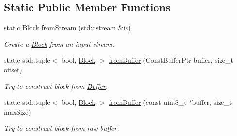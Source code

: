 \subsection*{Static Public Member Functions}
\begin{DoxyCompactItemize}
\item 
static \hyperlink{classndn_1_1Block}{Block} \hyperlink{classndn_1_1Block_ab8597954477e226870ebfe852b71eaef}{from\+Stream} (std\+::istream \&is)\hypertarget{classndn_1_1Block_ab8597954477e226870ebfe852b71eaef}{}\label{classndn_1_1Block_ab8597954477e226870ebfe852b71eaef}

\begin{DoxyCompactList}\small\item\em Create a \hyperlink{classndn_1_1Block}{Block} from an input stream. \end{DoxyCompactList}\item 
static std\+::tuple$<$ bool, \hyperlink{classndn_1_1Block}{Block} $>$ \hyperlink{classndn_1_1Block_af540ada44f352d3cbc246a8f878488e1}{from\+Buffer} (Const\+Buffer\+Ptr buffer, size\+\_\+t offset)
\begin{DoxyCompactList}\small\item\em Try to construct block from \hyperlink{classndn_1_1Buffer}{Buffer}. \end{DoxyCompactList}\item 
static std\+::tuple$<$ bool, \hyperlink{classndn_1_1Block}{Block} $>$ \hyperlink{classndn_1_1Block_a1bf94a97bafd1c0e3f7b21bc71416b1b}{from\+Buffer} (const uint8\+\_\+t $\ast$buffer, size\+\_\+t max\+Size)
\begin{DoxyCompactList}\small\item\em Try to construct block from raw buffer. \end{DoxyCompactList}\end{DoxyCompactItemize}
